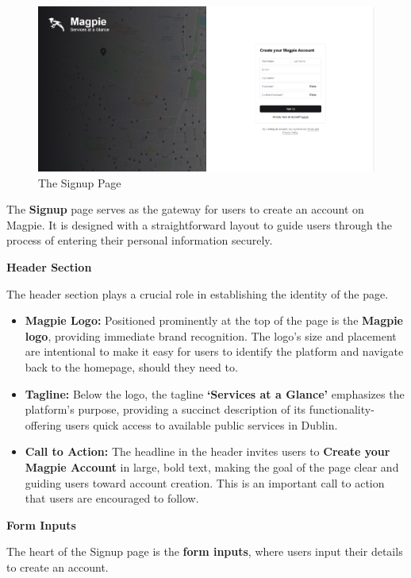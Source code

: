 \begin{figure}[htbp]
    \centering{}
    \includegraphics[width=1\textwidth]{images/site/signup/signup_page.png}
    \caption{The Signup Page}
\end{figure}

The \textbf{Signup} page serves as the gateway for users to create an account on
Magpie. It is designed with a straightforward layout to guide users through the
process of entering their personal information securely.

\textbf{Header Section}

The header section plays a crucial role in establishing the identity of the
page.
\begin{itemize}
    \item{} \textbf{Magpie Logo:} Positioned prominently at the top of the page
    is the \textbf{Magpie logo}, providing immediate brand recognition. The
    logo's size and placement are intentional to make it easy for users to
    identify the platform and navigate back to the homepage, should they need
    to.
    \item{} \textbf{Tagline:} Below the logo, the tagline \textbf{`Services at a
    Glance'} emphasizes the platform's purpose, providing a succinct description
    of its functionality{-}offering users quick access to available public
    services in Dublin.
    \item{} \textbf{Call to Action:} The headline in the header invites users to
    \textbf{Create your Magpie Account} in large, bold text, making the goal of
    the page clear and guiding users toward account creation. This is an
    important call to action that users are encouraged to follow.
\end{itemize}

\textbf{Form Inputs}

The heart of the Signup page is the \textbf{form inputs}, where users input
their details to create an account.

